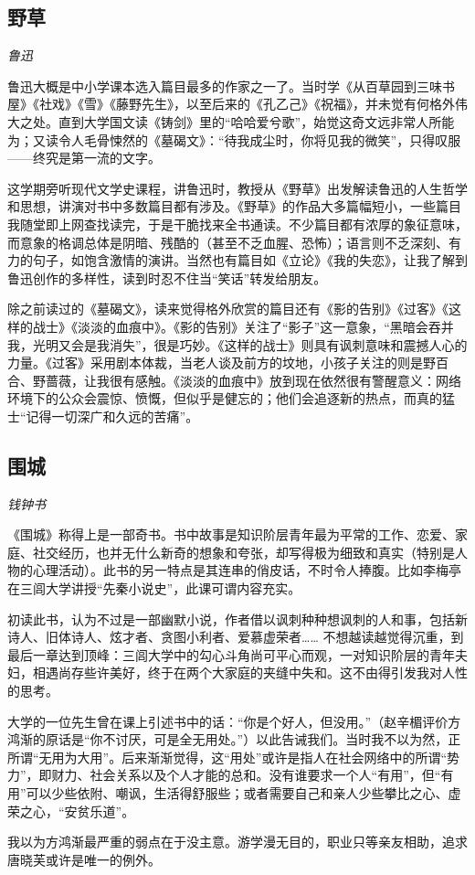 \subsection*{野草}
\par \emph{鲁迅} 
\par 鲁迅大概是中小学课本选入篇目最多的作家之一了。当时学《从百草园到三味书屋》《社戏》《雪》《藤野先生》，以至后来的《孔乙己》《祝福》，并未觉有何格外伟大之处。直到大学国文读《铸剑》里的“哈哈爱兮歌”，始觉这奇文远非常人所能为；又读令人毛骨悚然的《墓碣文》：“待我成尘时，你将见我的微笑”，只得叹服——终究是第一流的文字。
\par 这学期旁听现代文学史课程，讲鲁迅时，教授从《野草》出发解读鲁迅的人生哲学和思想，讲演对书中多数篇目都有涉及。《野草》的作品大多篇幅短小，一些篇目我随堂即上网查找读完，于是干脆找来全书通读。不少篇目都有浓厚的象征意味，而意象的格调总体是阴暗、残酷的（甚至不乏血腥、恐怖）；语言则不乏深刻、有力的句子，如饱含激情的演讲。当然也有篇目如《立论》《我的失恋》，让我了解到鲁迅创作的多样性，读到时忍不住当“笑话”转发给朋友。
\par 除之前读过的《墓碣文》，读来觉得格外欣赏的篇目还有《影的告别》《过客》《这样的战士》《淡淡的血痕中》。《影的告别》关注了“影子”这一意象，“黑暗会吞并我，光明又会是我消失”，很是巧妙。《这样的战士》则具有讽刺意味和震撼人心的力量。《过客》采用剧本体裁，当老人谈及前方的坟地，小孩子关注的则是野百合、野蔷薇，让我很有感触。《淡淡的血痕中》放到现在依然很有警醒意义：网络环境下的公众会震惊、愤慨，但似乎是健忘的；他们会追逐新的热点，而真的猛士“记得一切深广和久远的苦痛”。
\par {}

\subsection*{围城}
\par \emph{钱钟书} 
\par 《围城》称得上是一部奇书。书中故事是知识阶层青年最为平常的工作、恋爱、家庭、社交经历，也并无什么新奇的想象和夸张，却写得极为细致和真实（特别是人物的心理活动）。此书的另一特点是其连串的俏皮话，不时令人捧腹。比如李梅亭在三闾大学讲授“先秦小说史”，此课可谓内容充实。
\par 初读此书，认为不过是一部幽默小说，作者借以讽刺种种想讽刺的人和事，包括新诗人、旧体诗人、炫才者、贪图小利者、爱慕虚荣者…… 不想越读越觉得沉重，到最后一章达到顶峰：三闾大学中的勾心斗角尚可平心而观，一对知识阶层的青年夫妇，相遇尚存些许美好，终于在两个大家庭的夹缝中失和。这不由得引发我对人性的思考。
\par 大学的一位先生曾在课上引述书中的话：“你是个好人，但没用。”（赵辛楣评价方鸿渐的原话是“你不讨厌，可是全无用处。”）以此告诫我们。当时我不以为然，正所谓“无用为大用”。后来渐渐觉得，这“用处”或许是指人在社会网络中的所谓“势力”，即财力、社会关系以及个人才能的总和。没有谁要求一个人“有用”，但“有用”可以少些依附、嘲讽，生活得舒服些；或者需要自己和亲人少些攀比之心、虚荣之心，“安贫乐道”。
\par 我以为方鸿渐最严重的弱点在于没主意。游学漫无目的，职业只等亲友相助，追求唐晓芙或许是唯一的例外。
\par {}

